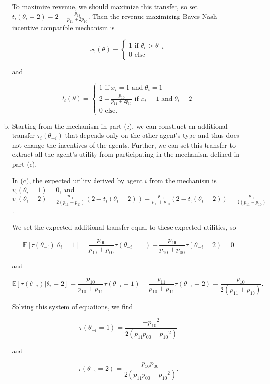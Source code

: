 \documentclass{article}
\begin{document}
\begin{enumerate}[(a)]
	To maximize revenue, we should maximize this transfer, so set $t_i(\theta_i = 2) = 2 - \frac{p_{10}}{p_{11} + 2p_{10}}$. Then the revenue-maximizing Bayes-Nash incentive compatible mechanism is

	$$x_i(\theta) = \begin{cases}
		1 \text{ if } \theta_i > \theta_{-i} \\
		0 \text{ else}
	\end{cases}$$

	and

	$$t_i(\theta) = \begin{cases}
		1 \text{ if } x_i = 1 \text{ and } \theta_i = 1 \\
		2 - \frac{p_{10}}{p_{11} + 2p_{10}} \text{ if } x_i = 1 \text{ and } \theta_i = 2 \\
		0 \text{ else.}
	\end{cases}$$

	\item

	Starting from the mechanism in part (c), we can construct an additional transfer $\tau_i(\theta_{-i})$ that depends only on the other agent's type and thus does not change the incentives of the agents. Further, we can set this transfer to extract all the agent's utility from participating in the mechanism defined in part (c).

	In (c), the expected utility derived by agent $i$ from the mechanism is $v_i(\theta_i = 1) = 0$, and $v_i(\theta_i = 2) = \frac{p_{11}}{2(p_{11} + p_{10})} (2 - t_i(\theta_i = 2)) + \frac{p_{10}}{p_{11} + p_{10}} (2 - t_i(\theta_i = 2)) = \frac{p_{10}}{2(p_{11} + p_{10})}$.

	We set the expected additional transfer equal to these expected utilities, so

	$$\mathbb{E}[\tau(\theta_{-i}) | \theta_i = 1] = \frac{p_{00}}{p_{10} + p_{00}} \tau(\theta_{-i} = 1) + \frac{p_{10}}{p_{10} + p_{00}} \tau(\theta_{-i} = 2) = 0$$

	and

	$$\mathbb{E}[\tau(\theta_{-i}) | \theta_i = 2] = \frac{p_{10}}{p_{10} + p_{11}} \tau(\theta_{-i} = 1) + \frac{p_{11}}{p_{10} + p_{11}} \tau(\theta_{-i} = 2) = \frac{p_{10}}{2(p_{11} + p_{10})}.$$

	Solving this system of equations, we find

	$$\tau(\theta_{-i} = 1) = \frac{-{p_{10}}^2}{2(p_{11}p_{00} - {p_{10}}^2)}$$

	and

	$$\tau(\theta_{-i} = 2) = \frac{p_{10}p_{00}}{2(p_{11}p_{00} - {p_{10}}^2)}.$$


\end{enumerate}
\end{document}
